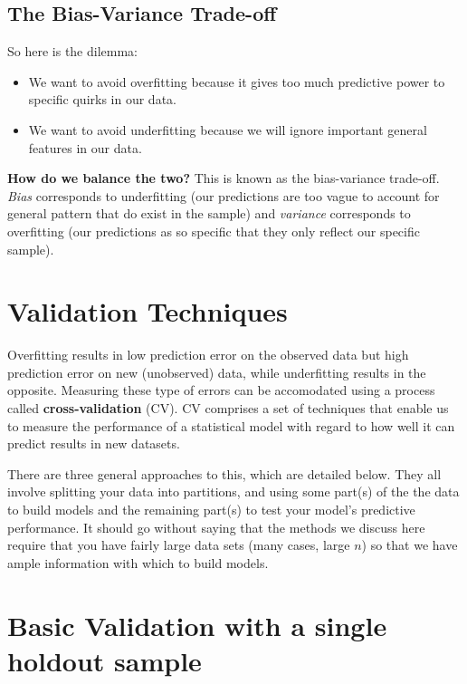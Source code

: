\documentclass[
]{book}
\providecommand{\tightlist}{%
  \setlength{\itemsep}{0pt}\setlength{\parskip}{0pt}}
\begin{document}
\hypertarget{the-bias-variance-trade-off}{%
\subsection{The Bias-Variance Trade-off}\label{the-bias-variance-trade-off}}

So here is the dilemma:

\begin{itemize}
\tightlist
\item
  We want to avoid overfitting because it gives too much predictive power to specific quirks in our data.
\item
  We want to avoid underfitting because we will ignore important general features in our data.
\end{itemize}

\textbf{How do we balance the two?} This is known as the bias-variance trade-off. \emph{Bias} corresponds to underfitting (our predictions are too vague to account for general pattern that do exist in the sample) and \emph{variance} corresponds to overfitting (our predictions as so specific that they only reflect our specific sample).

\hypertarget{validation-techniques}{%
\section{Validation Techniques}\label{validation-techniques}}

Overfitting results in low prediction error on the observed data but high prediction error on new (unobserved) data, while underfitting results in the opposite. Measuring these type of errors can be accomodated using a process called \textbf{cross-validation} (CV). CV comprises a set of techniques that enable us to measure the performance of a statistical model with regard to how well it can predict results in new datasets.

There are three general approaches to this, which are detailed below. They all involve splitting your data into partitions, and using some part(s) of the the data to build models and the remaining part(s) to test your model's predictive performance. It should go without saying that the methods we discuss here require that you have fairly large data sets (many cases, large \(n\)) so that we have ample information with which to build models.

\hypertarget{basic-validation-with-a-single-holdout-sample}{%
\section{Basic Validation with a single holdout sample}\label{basic-validation-with-a-single-holdout-sample}}
\end{document}
